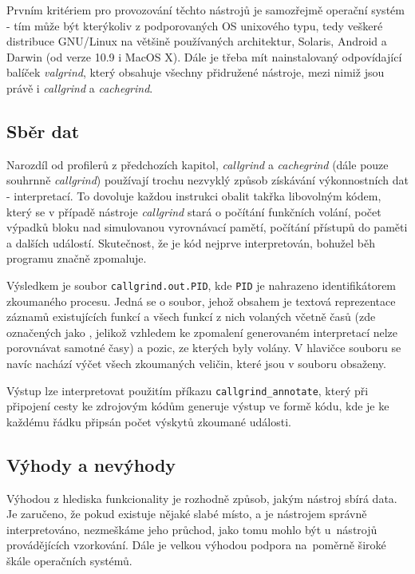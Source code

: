\documentclass[czech,BP]{thesiskiv}
\begin{document}
Prvním kritériem pro provozování těchto nástrojů je samozřejmě operační systém - tím může být kterýkoliv z podporovaných OS unixového typu, tedy veškeré distribuce GNU/Linux na většině používaných architektur, Solaris, Android a Darwin (od verze 10.9 i MacOS X)\cite{grind1}. Dále je třeba mít nainstalovaný odpovídající balíček \emph{valgrind}, který obsahuje všechny přidružené nástroje, mezi nimiž jsou právě i \emph{callgrind} a \emph{cachegrind}.

\subsection*{Sběr dat}

Narozdíl od profilerů z předchozích kapitol, \emph{callgrind} a \emph{cachegrind} (dále pouze souhrnně \emph{callgrind}) používají trochu nezvyklý způsob získávání výkonnostních dat - interpretací. To dovoluje každou instrukci obalit takřka libovolným kódem, který se v případě nástroje \emph{callgrind} stará o počítání funkčních volání, počet výpadků bloku nad simulovanou vyrovnávací pamětí, počítání přístupů do paměti a dalších událostí. Skutečnost, že je kód nejprve interpretován, bohužel běh programu značně zpomaluje.

Výsledkem je soubor \texttt{callgrind.out.PID}, kde \texttt{PID} je nahrazeno identifikátorem zkoumaného procesu. Jedná se o soubor, jehož obsahem je textová reprezentace záznamů existujících funkcí a všech funkcí z nich volaných včetně časů (zde označených jako , jelikož vzhledem ke zpomalení generovaném interpretací nelze porovnávat samotné časy) a pozic, ze kterých byly volány. V hlavičce souboru se navíc nachází výčet všech zkoumaných veličin, které jsou v souboru obsaženy\cite{grind3}.

Výstup lze interpretovat použitím příkazu \texttt{callgrind\_annotate}, který při připojení cesty ke zdrojovým kódům generuje výstup ve formě kódu, kde je ke každému řádku připsán počet výskytů zkoumané události.

\subsection*{Výhody a nevýhody}

Výhodou z hlediska funkcionality je rozhodně způsob, jakým nástroj sbírá data. Je zaručeno, že pokud existuje nějaké slabé místo, a je nástrojem správně interpretováno, nezmeškáme jeho průchod, jako tomu mohlo být u~nástrojů provádějících vzorkování. Dále je velkou výhodou podpora na~poměrně široké škále operačních systémů.
\end{document}
